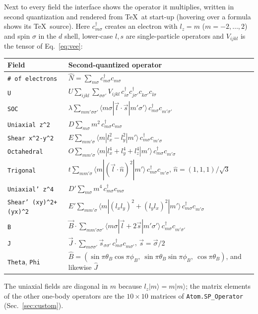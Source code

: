 \documentclass[11pt,a4paper]{article}
\newcommand{\op}[1]{\texttt{#1}}
\newcommand{\cd}[1]{c^{\dagger}_{#1}}
\newcommand{\cc}[1]{c^{\phantom{\dagger}}_{#1}}
\begin{document}
Next to every field the interface shows the operator it multiplies, written in
second quantization and rendered from \TeX\ at start-up (hovering over a
formula shows its \TeX\ source).  Here $\cd{m\sigma}$ creates an electron with
$l_z=m$ ($m=-2,\dots,2$) and spin $\sigma$ in the $d$ shell, lower-case $l,s$
are single-particle operators and $V_{ijkl}$ is the tensor of
Eq.~\eqref{eq:vee}:
\begin{center}
\begin{tabular}{ll}
\toprule
Field & Second-quantized operator\\
\midrule
\op{\# of electrons} & $\hat N=\sum_{m\sigma}\cd{m\sigma}\cc{m\sigma}$\\[2pt]
\op{U} & $U\sum_{ijkl}\sum_{\sigma\sigma'}V_{ijkl}\,\cd{i\sigma}\cd{j\sigma'}\cc{k\sigma'}\cc{l\sigma}$\\[2pt]
\op{SOC} & $\lambda\sum_{mm'\sigma\sigma'}\langle m\sigma|\vec l\cdot\vec s|m'\sigma'\rangle\,\cd{m\sigma}\cc{m'\sigma'}$\\[2pt]
\op{Uniaxial z\^{}2} & $D\sum_{m\sigma}m^{2}\,\cd{m\sigma}\cc{m\sigma}$\\[2pt]
\op{Shear x\^{}2-y\^{}2} & $E\sum_{mm'\sigma}\langle m|l_x^{2}-l_y^{2}|m'\rangle\,\cd{m\sigma}\cc{m'\sigma}$\\[2pt]
\op{Octahedral} & $O\sum_{mm'\sigma}\langle m|l_x^{4}+l_y^{4}+l_z^{4}|m'\rangle\,\cd{m\sigma}\cc{m'\sigma}$\\[2pt]
\op{Trigonal} & $t\sum_{mm'\sigma}\langle m|(\vec l\cdot\hat n)^{2}|m'\rangle\,\cd{m\sigma}\cc{m'\sigma}$, \quad $\hat n=(1,1,1)/\sqrt3$\\[2pt]
\op{Uniaxial' z\^{}4} & $D'\sum_{m\sigma}m^{4}\,\cd{m\sigma}\cc{m\sigma}$\\[2pt]
\op{Shear' (xy)\^{}2+(yx)\^{}2} & $E'\sum_{mm'\sigma}\langle m|(l_xl_y)^{2}+(l_yl_x)^{2}|m'\rangle\,\cd{m\sigma}\cc{m'\sigma}$\\[2pt]
\op{B} & $\vec B\cdot\sum_{mm'\sigma\sigma'}\langle m\sigma|\vec l+2\vec s|m'\sigma'\rangle\,\cd{m\sigma}\cc{m'\sigma'}$\\[2pt]
\op{J} & $\vec J\cdot\sum_{m\sigma\sigma'}\vec s_{\sigma\sigma'}\,\cd{m\sigma}\cc{m\sigma'}$, \quad $\vec s=\vec\sigma/2$\\[2pt]
\op{Theta}, \op{Phi} & $\hat B=(\sin\pi\theta_B\cos\pi\phi_B,\ \sin\pi\theta_B\sin\pi\phi_B,\ \cos\pi\theta_B)$, and likewise $\hat J$\\
\bottomrule
\end{tabular}
\end{center}
The uniaxial fields are diagonal in $m$ because $l_z|m\rangle=m|m\rangle$; the
matrix elements of the other one-body operators are the $10\times10$ matrices
of \op{Atom.SP\_Operator} (Sec.~\ref{sec:custom}).
\end{document}
